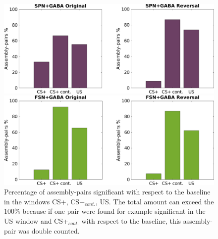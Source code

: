 \begin{figure}
    \centering
    \includegraphics[scale=0.36]{figures/SPN_GABAHisto.pdf}
    
    \vspace{1cm}
    
    \includegraphics[scale=0.36]{figures/FSN_GABAHisto.pdf}
    \caption{Percentage of assembly-pairs significant with respect to the baseline in the windows CS+, CS+$_{cont.}$, US. The total amount can exceed the $100\%$ because if one pair were found for example significant in the US window and CS+$_{cont.}$ with respect to the baseline, this assembly-pair was double counted.}
    \label{fig:FriedHistoGABA}
\end{figure}\\
\pagebreak
